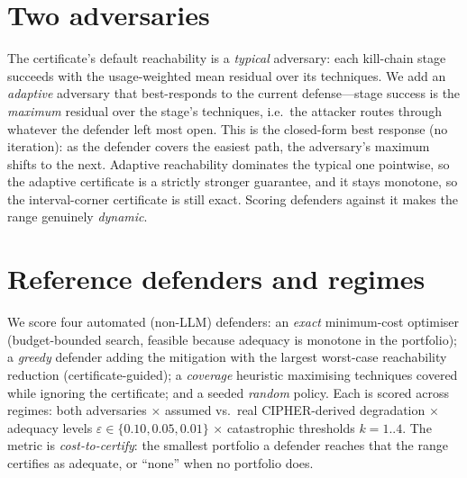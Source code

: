 \documentclass[conference,compsoc]{IEEEtran}
\begin{document}
\section{Two adversaries}
The certificate's default reachability is a \emph{typical} adversary: each kill-chain
stage succeeds with the usage-weighted mean residual over its techniques. We add an
\emph{adaptive} adversary that best-responds to the current defense---stage success
is the \emph{maximum} residual over the stage's techniques, i.e.\ the attacker routes
through whatever the defender left most open. This is the closed-form best response
(no iteration): as the defender covers the easiest path, the adversary's maximum
shifts to the next. Adaptive reachability dominates the typical one pointwise, so the
adaptive certificate is a strictly stronger guarantee, and it stays monotone, so the
interval-corner certificate is still exact. Scoring defenders against it makes the
range genuinely \emph{dynamic}.

\section{Reference defenders and regimes}
We score four automated (non-LLM) defenders: an \emph{exact} minimum-cost optimiser
(budget-bounded search, feasible because adequacy is monotone in the portfolio); a
\emph{greedy} defender adding the mitigation with the largest worst-case reachability
reduction (certificate-guided); a \emph{coverage} heuristic maximising techniques
covered while ignoring the certificate; and a seeded \emph{random} policy. Each is
scored across \RangeRegimes{} regimes: both adversaries $\times$ assumed vs.\ real
CIPHER-derived degradation $\times$ adequacy levels
$\varepsilon\in\{0.10,0.05,0.01\}$ $\times$ catastrophic thresholds $k=1..4$. The
metric is \emph{cost-to-certify}: the smallest portfolio a defender reaches that the
range certifies as adequate, or ``none'' when no portfolio does.
\end{document}
